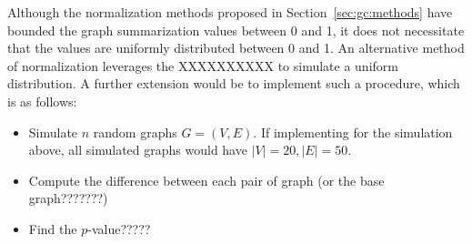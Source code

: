 Although the normalization methods proposed in Section~\ref{sec:gc:methods} 
have bounded the graph summarization values between 0 and 1, it does not 
necessitate that the values are uniformly distributed between 0 and 1. An 
alternative method of normalization leverages the XXXXXXXXXX to simulate a 
uniform distribution. A further extension would be to implement such a 
procedure, which is as follows:

\tablespacing
\begin{itemize}
	\item Simulate $n$ random graphs $G=(V,E)$. If implementing for the 
	simulation above, all simulated graphs would have $|V|=20, |E|=50$.
	\item Compute the difference between each pair of graph (or the base 
	graph???????)
	\item Find the $p$-value?????
\end{itemize}
\bodyspacing
